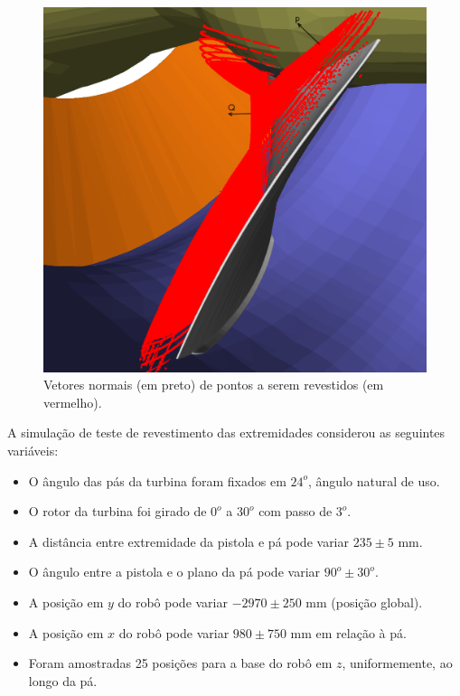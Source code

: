 \begin{figure}[!ht]
	\centering	
	\includegraphics[width=.5\columnwidth]{figs/normal.png}
	\caption{Vetores normais (em preto) de pontos a serem revestidos (em
	vermelho).}
	\label{fig::normal}
\end{figure}

A simulação de teste de revestimento das extremidades considerou as seguintes
variáveis: 

\begin{itemize}
  \item O ângulo das pás da turbina foram fixados em $24^o$, ângulo natural de
  uso.
  \item O rotor da turbina foi girado de $0^o$ a $30^o$ com passo de $3^o$.
  \item A distância entre extremidade da pistola e pá pode variar $235
  \pm 5$ mm.
  \item O ângulo entre a pistola e o plano da pá pode variar $90^o \pm
  30^o$.
  \item A posição em $y$ do robô pode variar $-2970 \pm 250$ mm (posição
  global).
  \item A posição em $x$ do robô pode variar $980 \pm 750$ mm em relação à pá.
  \item Foram amostradas 25 posições para a base do robô em $z$, uniformemente,
  ao longo da pá.
\end{itemize}
